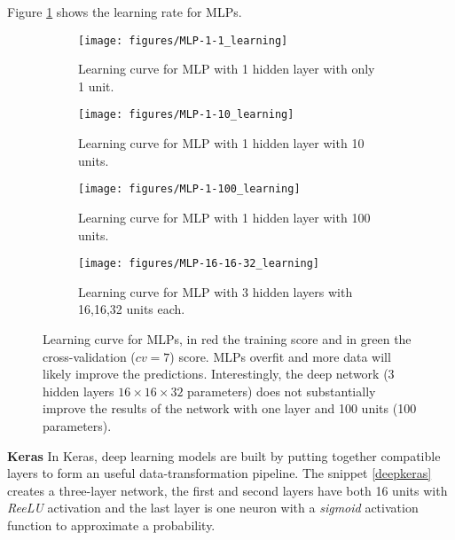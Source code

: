 \documentclass[11pt]{article}
\theoremstyle{definition}
\theoremstyle{remark}
\begin{document}
Figure \ref{fig:mlp_learning} shows the learning rate for MLPs.
\begin{figure}[H]
    \centering
    \begin{subfigure}[t]{1\textwidth}
        \centering
        \texttt{[image: figures/MLP-1-1\_learning]}
        \caption{Learning curve for MLP with 1 hidden layer with only 1 unit.}
    \end{subfigure}

    \begin{subfigure}[t]{1\textwidth}
        \centering
        \texttt{[image: figures/MLP-1-10\_learning]}
        \caption{Learning curve for MLP with 1 hidden layer with 10 units.}
    \end{subfigure}%

    \begin{subfigure}[t]{1\textwidth}
        \centering
        \texttt{[image: figures/MLP-1-100\_learning]}
        \caption{Learning curve for MLP with 1 hidden layer with 100 units.}
    \end{subfigure}%

    \begin{subfigure}[t]{1\textwidth}
        \centering
        \texttt{[image: figures/MLP-16-16-32\_learning]}
        \caption{Learning curve for MLP with 3 hidden layers with 16,16,32 units each.}
    \end{subfigure}%
    
    \caption{Learning curve for  MLPs, in red the training score and in green the cross-validation ($cv=7$) score. MLPs overfit and more data will likely improve the predictions. Interestingly, the deep network (3 hidden layers $16 \times 16 \times 32$ parameters) does not substantially improve the results of the network with one layer and 100 units (100 parameters).} \label{fig:mlp_learning}
\end{figure}


\textbf{Keras}
In Keras, deep learning models are built by putting together compatible layers to form an useful data-transformation pipeline. The snippet \ref{deepkeras} creates a three-layer network, the first and second layers have both 16 units with \emph{ReeLU} activation and the last layer is one neuron with a \emph{sigmoid} activation function to approximate a probability.
\end{document}
